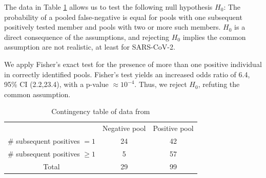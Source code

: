 \documentclass{article}
\begin{document}
The data in Table \ref{table} allows us to test the following null
hypothesis $H_0$: The probability of a pooled false-negative is equal
for pools with one subsequent positively tested member and pools with
two or more such members. $H_0$ is a direct consequence of the
assumptions, and rejecting $H_0$ implies the common assumption are not
realistic, at least for SARS-CoV-2.

We apply Fisher's exact test for the presence of more than one
positive individual in correctly identified pools. Fisher's test
yields an increased odds ratio of 6.4, 95\% CI (2.2,23.4), with a
p-value $\approx 10^{-4}$. Thus, we reject $H_0$, refuting the common
assumption.

\begin{table}[h]
\centering
\begin{tabular}{ c c c }
                                & Negative pool  & Positive pool \\%
\# subsequent positives $=1$    & 24             & 42            \\%
\# subsequent positives $\geq1$ & 5              & 57            \\%
 Total                          & 29             & 99            \\%
\end{tabular}
\caption{Contingency table of data from \cite{Salazar}}\label{table}
\end{table}
\end{document}
